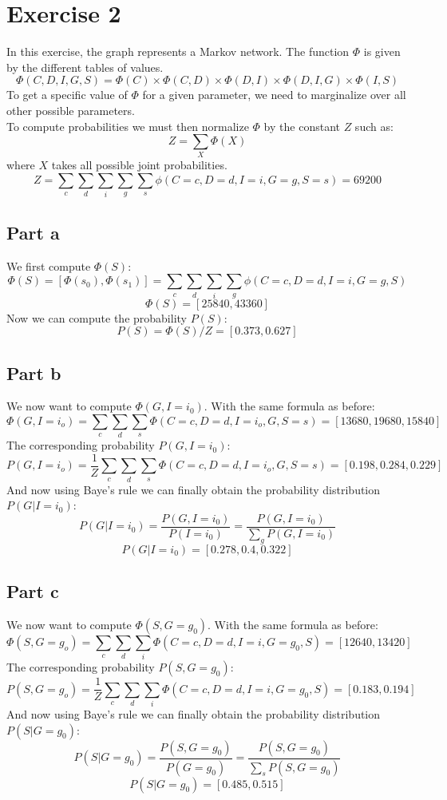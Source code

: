 \documentclass[a4paper, 10pt]{article}
\begin{document}
\section{Exercise 2}
In this exercise, the graph represents a Markov network. The function $\Phi$ is given by the 
different tables of values.
$$
\Phi(C,D,I,G,S) = \Phi(C) \times \Phi(C,D) \times \Phi(D,I) \times \Phi(D,I,G) \times \Phi(I,S)
$$
To get a specific value of $\Phi$ for a given parameter, we need to marginalize over all other
possible parameters.
\\
To compute probabilities we must then normalize $\Phi$ by the constant $Z$ such as:
$$
Z = \sum_X \Phi(X)
$$
where $X$ takes all possible joint probabilities.
$$
Z = \sum_c \sum_d \sum_i \sum_g \sum_s \phi(C=c, D=d, I=i, G=g, S=s) = 69200
$$
\subsection{Part a}
We first compute $\Phi(S)$:
$$
\Phi(S) = \left[\Phi(s_0), \Phi(s_1)\right] = \sum_c \sum_d \sum_i \sum_g \phi(C=c, D=d, I=i, G=g, S)
$$
$$
\Phi(S) = \left[25840, 43360\right]
$$
Now we can compute the probability $P(S)$:
$$
P(S) = \Phi(S)/Z = \left[0.373, 0.627\right]
$$
\subsection{Part b}
We now want to compute $\Phi(G, I=i_0)$. With the same formula as before:
$$
\Phi(G, I=i_o) = \sum_c \sum_d \sum_s \Phi(C=c, D=d, I=i_o, G, S=s) = \left[13680, 19680, 15840\right]
$$
The corresponding probability $P(G, I=i_0)$:
$$
P(G, I=i_o) = \frac{1}{Z} \sum_c \sum_d \sum_s \Phi(C=c, D=d, I=i_o, G, S=s) = \left[0.198, 0.284, 0.229\right]
$$
And now using Baye's rule we can finally obtain the probability distribution $P(G\vert I=i_0)$:
$$
P(G\vert I=i_0) = \frac{P(G, I=i_0)}{P(I=i_0)} = \frac{P(G, I=i_0)}{\sum_g P(G, I=i_0)}
$$
$$
P(G\vert I=i_0) = \left[0.278, 0.4, 0.322\right] 
$$
\subsection{Part c}
We now want to compute $\Phi(S, G=g_0)$. With the same formula as before:
$$
\Phi(S, G=g_o) = \sum_c \sum_d \sum_i \Phi(C=c, D=d, I=i, G=g_0, S) = \left[12640, 13420\right]
$$
The corresponding probability $P(S, G=g_0)$:
$$
P(S, G=g_o) = \frac{1}{Z} \sum_c \sum_d \sum_i \Phi(C=c, D=d, I=i, G=g_0, S) = \left[0.183, 0.194\right]
$$
And now using Baye's rule we can finally obtain the probability distribution $P(S\vert G=g_0)$:
$$
P(S\vert G=g_0) = \frac{P(S, G=g_0)}{P(G=g_0)} = \frac{P(S, G=g_0)}{\sum_s P(S, G=g_0)}
$$
$$
P(S\vert G=g_0) = \left[0.485, 0.515\right] 
$$
\end{document}
